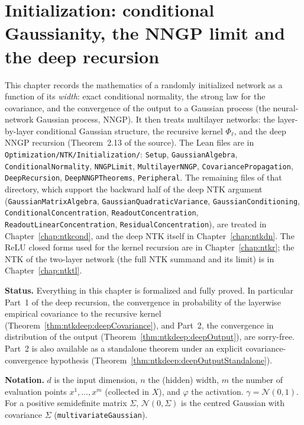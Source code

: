 \chapter{Initialization: conditional Gaussianity, the NNGP limit and the deep recursion}\label{chap:ntkdeep}

This chapter records the mathematics of a randomly initialized network as a function of its \emph{width}: exact conditional normality, the strong law for the covariance, and the convergence of the output to a Gaussian process (the neural-network Gaussian process, NNGP).
It then treats multilayer networks: the layer-by-layer conditional Gaussian structure, the recursive kernel $\Phi_\ell$, and the deep NNGP recursion (Theorem~2.13 of the source).
The Lean files are in \texttt{Optimization/NTK/Initialization/}: \texttt{Setup}, \texttt{GaussianAlgebra}, \texttt{ConditionalNormality}, \texttt{NNGPLimit}, \texttt{MultilayerNNGP}, \texttt{CovariancePropagation}, \texttt{DeepRecursion}, \texttt{DeepNNGPTheorems}, \texttt{Peripheral}.
The remaining files of that directory, which support the backward half of the deep NTK argument (\texttt{GaussianMatrixAlgebra}, \texttt{GaussianQuadraticVariance}, \texttt{GaussianConditioning}, \texttt{ConditionalConcentration}, \texttt{ReadoutConcentration}, \texttt{ReadoutLinearConcentration}, \texttt{ResidualConcentration}), are treated in Chapter~\ref{chap:ntkcond}, and the deep NTK itself in Chapter~\ref{chap:ntkdn}.
The ReLU closed forms used for the kernel recursion are in Chapter~\ref{chap:ntkr}; the NTK of the two-layer network (the full NTK summand and its limit) is in Chapter~\ref{chap:ntktl}.

\medskip\noindent\textbf{Status.}
Everything in this chapter is formalized and fully proved. In particular Part~1 of the deep recursion, the convergence in probability of the layerwise empirical covariance to the recursive kernel (Theorem~\ref{thm:ntkdeep:deepCovariance}), and Part~2, the convergence in distribution of the output (Theorem~\ref{thm:ntkdeep:deepOutput}), are sorry-free. Part~2 is also available as a standalone theorem under an explicit covariance-convergence hypothesis (Theorem~\ref{thm:ntkdeep:deepOutputStandalone}).

\medskip\noindent\textbf{Notation.}
$d$ is the input dimension, $n$ the (hidden) width, $m$ the number of evaluation points $x^1,\dots,x^m$ (collected in $X$), and $\varphi$ the activation. $\gamma=\mathcal N(0,1)$.
For a positive semidefinite matrix $\Sigma$, $\mathcal N(0,\Sigma)$ is the centred Gaussian with covariance $\Sigma$ (\texttt{multivariateGaussian}).


